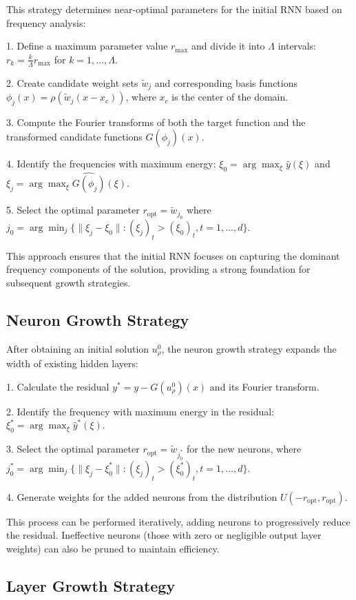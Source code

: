 \documentclass[11pt,a4paper]{article}
\begin{document}
This strategy determines near-optimal parameters for the initial RNN based on frequency analysis:

1. Define a maximum parameter value $r_{\text{max}}$ and divide it into $\Lambda$ intervals: $r_k = \frac{k}{\Lambda}r_{\text{max}}$ for $k = 1,\ldots,\Lambda$.

2. Create candidate weight sets $\tilde{w}_j$ and corresponding basis functions $\phi_j(x) = \rho(\tilde{w}_j(x-x_c))$, where $x_c$ is the center of the domain.

3. Compute the Fourier transforms of both the target function and the transformed candidate functions $G(\phi_j)(x)$.

4. Identify the frequencies with maximum energy: $\xi_0 = \arg\max_\xi \hat{y}(\xi)$ and $\xi_j = \arg\max_\xi \widehat{G(\phi_j)}(\xi)$.

5. Select the optimal parameter $r_{\text{opt}} = \tilde{w}_{j_0}$ where $j_0 = \arg\min_j\{\|\xi_j-\xi_0\| : (\xi_j)_t > (\xi_0)_t, t = 1,\ldots,d\}$.

This approach ensures that the initial RNN focuses on capturing the dominant frequency components of the solution, providing a strong foundation for subsequent growth strategies.

\subsection{Neuron Growth Strategy}

After obtaining an initial solution $u^0_\rho$, the neuron growth strategy expands the width of existing hidden layers:

1. Calculate the residual $y^* = y - G(u^0_\rho)(x)$ and its Fourier transform.

2. Identify the frequency with maximum energy in the residual: $\xi^*_0 = \arg\max_\xi \hat{y}^*(\xi)$.

3. Select the optimal parameter $r_{\text{opt}} = \tilde{w}_{j^*_0}$ for the new neurons, where $j^*_0 = \arg\min_j\{\|\xi_j-\xi^*_0\| : (\xi_j)_t > (\xi^*_0)_t, t = 1,\ldots,d\}$.

4. Generate weights for the added neurons from the distribution $U(-r_{\text{opt}}, r_{\text{opt}})$.

This process can be performed iteratively, adding neurons to progressively reduce the residual. Ineffective neurons (those with zero or negligible output layer weights) can also be pruned to maintain efficiency.

\subsection{Layer Growth Strategy}
\end{document}
